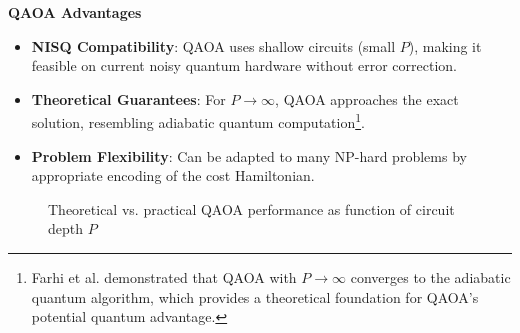 
\noindent
{}
\textbf{QAOA Advantages}
\begin{itemize}
  \item \textbf{NISQ Compatibility}: QAOA uses shallow circuits (small
    $P$), making it feasible on current noisy quantum hardware without error
    correction.

  \item \textbf{Theoretical Guarantees}: For $P \to \infty$, QAOA approaches
    the exact solution, resembling adiabatic quantum
    computation\footnote{Farhi et al. demonstrated that QAOA with $P \to
    \infty$ converges to the adiabatic quantum algorithm, which provides a
  theoretical foundation for QAOA's potential quantum advantage.}.

  \item \textbf{Problem Flexibility}: Can be adapted to many NP-hard problems
    by appropriate encoding of the cost Hamiltonian.

\end{itemize}



\vspace{0.3cm}

\begin{figure}[H]
  \centering
  \caption{Theoretical vs. practical QAOA performance as function of circuit
  depth $P$}
  \label{fig:qaoa-performance}
\end{figure}

